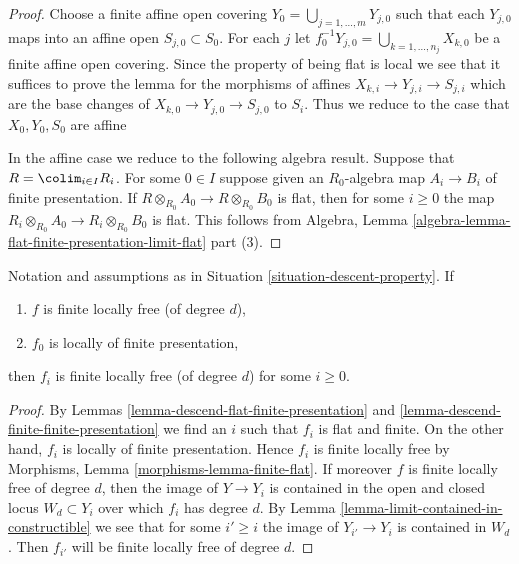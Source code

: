 \begin{proof}
Choose a finite affine open covering
$Y_0 = \bigcup_{j = 1, \ldots, m} Y_{j, 0}$
such that each $Y_{j, 0}$ maps into an affine open
$S_{j, 0} \subset S_0$. For each $j$ let
$f_0^{-1}Y_{j, 0} = \bigcup_{k = 1, \ldots, n_j} X_{k, 0}$ be a
finite affine open covering. Since the property of being flat is
local we see that it suffices to prove the lemma for the morphisms
of affines $X_{k, i} \to Y_{j, i} \to S_{j, i}$ which are the base
changes of $X_{k, 0} \to Y_{j, 0} \to S_{j, 0}$ to $S_i$.
Thus we reduce to the case that $X_0, Y_0, S_0$ are affine

\medskip\noindent
In the affine case we reduce to the following algebra result.
Suppose that $R = \colim_{i \in I} R_i$. For some $0 \in I$
suppose given an $R_0$-algebra map $A_i \to B_i$ of finite presentation.
If $R \otimes_{R_0} A_0 \to R \otimes_{R_0} B_0$ is flat, then
for some $i \geq 0$ the map
$R_i \otimes_{R_0} A_0 \to R_i \otimes_{R_0} B_0$ is flat.
This follows from Algebra,
Lemma \ref{algebra-lemma-flat-finite-presentation-limit-flat} part (3).
\end{proof}

\begin{lemma}
\label{lemma-descend-finite-locally-free}
Notation and assumptions as in Situation \ref{situation-descent-property}.
If
\begin{enumerate}
\item $f$ is finite locally free (of degree $d$),
\item $f_0$ is locally of finite presentation,
\end{enumerate}
then $f_i$ is finite locally free (of degree $d$) for some $i \geq 0$.
\end{lemma}

\begin{proof}
By
Lemmas \ref{lemma-descend-flat-finite-presentation} and
\ref{lemma-descend-finite-finite-presentation}
we find an $i$ such that $f_i$ is flat and finite.
On the other hand, $f_i$ is locally of finite presentation.
Hence $f_i$ is finite locally free by
Morphisms, Lemma \ref{morphisms-lemma-finite-flat}.
If moreover $f$ is finite locally free of degree $d$,
then the image of $Y \to Y_i$ is contained in the
open and closed locus $W_d \subset Y_i$ over which $f_i$ has degree
$d$. By
Lemma \ref{lemma-limit-contained-in-constructible}
we see that for some $i' \geq i$ the image of $Y_{i'} \to Y_i$
is contained in $W_d$.
Then $f_{i'}$ will be finite locally free of degree $d$.
\end{proof}

